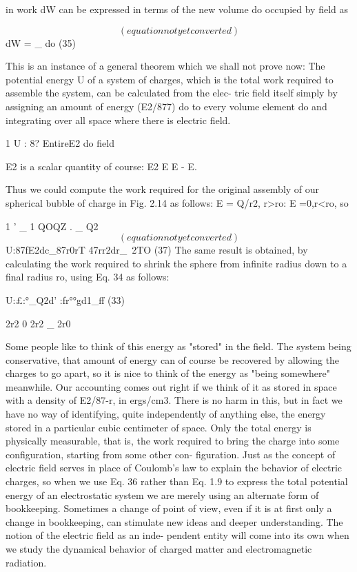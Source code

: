 in work dW can be expressed in terms of the new volume do occupied
by field as

\begin{equation}
(equation not yet converted)
\end{equation}
dW = _ do (35)

This is an instance of a general theorem which we shall not prove
now: The potential energy U of a system of charges, which is the total
work required to assemble the system, can be calculated from the elec-
tric field itself simply by assigning an amount of energy (E2/877) do to
every volume element do and integrating over all space where there
is electric field.

1
U : 8? EntireE2 do 
field

E2 is a scalar quantity of course: E2 E E - E.

Thus we could compute the work required for the original assembly
of our spherical bubble of charge in Fig. 2.14 as follows: E = Q/r2,
r>ro: E =0,r<ro, so

1 ' _ 1 QOQZ . _ Q2
\begin{equation}
(equation not yet converted)
\end{equation}
U:87fE2dc_87r0rT 47rr2dr_~2TO (37)
The same result is obtained, by calculating the work required to
shrink the sphere from infinite radius down to a final radius ro, using
Eq. 34 as follows:

U:£:°_Q2d' :fr°°gd1_ff (33)

2r2 0 2r2 _ 2r0

 

Some people like to think of this energy as "stored" in the field.
The system being conservative, that amount of energy can of course
be recovered by allowing the charges to go apart, so it is nice to think
of the energy as "being somewhere" meanwhile. Our accounting
comes out right if we think of it as stored in space with a density of
E2/87-r, in ergs/cm3. There is no harm in this, but in fact we have no
way of identifying, quite independently of anything else, the energy
stored in a particular cubic centimeter of space. Only the total
energy is physically measurable, that is, the work required to bring
the charge into some configuration, starting from some other con-
figuration. Just as the concept of electric field serves in place of
Coulomb's law to explain the behavior of electric charges, so when
we use Eq. 36 rather than Eq. 1.9 to express the total potential energy
of an electrostatic system we are merely using an alternate form of
bookkeeping. Sometimes a change of point of view, even if it is at
first only a change in bookkeeping, can stimulate new ideas and
deeper understanding. The notion of the electric field as an inde-
pendent entity will come into its own when we study the dynamical
behavior of charged matter and electromagnetic radiation.

